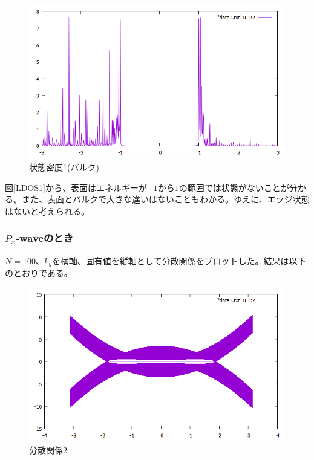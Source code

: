 \documentclass{jsarticle}
\begin{document}
            \begin{figure}[H]
                \centering
                \includegraphics[scale=0.5]{LDOSb_bry.png}
                \caption{状態密度1(バルク)}
                \label{LDOS1b}
            \end{figure}
    
            図\eqref{LDOS1}から、表面はエネルギーが$-1$から$1$の範囲では状態がないことが分かる。また、表面とバルクで大きな違いはないこともわかる。ゆえに、エッジ状態はないと考えられる。
    
            \subsubsection{$P_x$-waveのとき}
            $N=100$、$k_y$を横軸、固有値を縦軸として分散関係をプロットした。結果は以下のとおりである。
    
            \begin{figure}[H]
                \centering
                \includegraphics[scale=0.5]{BdG2_bry.png}
                \caption{分散関係2}
                \label{Dispersion2}
            \end{figure}
    
\end{document}
